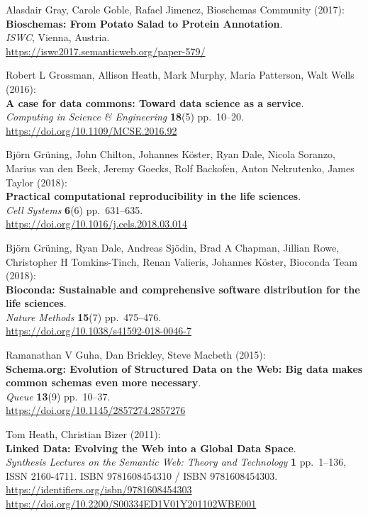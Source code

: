 \begin{thebibliography}{9}
Alasdair Gray, Carole Goble, Rafael Jimenez, Bioschemas
Community (2017):\\
\textbf{Bioschemas: From Potato Salad to Protein Annotation}.\\
\emph{ISWC}, Vienna, Austria.\\
\url{https://iswc2017.semanticweb.org/paper-579/}

Robert L Grossman, Allison Heath, Mark Murphy, Maria Patterson,
Walt Wells (2016):\\
\textbf{A case for data commons: Toward data science as a service}.\\
\emph{Computing in Science \& Engineering} \textbf{18}(5) pp.~10--20.\\
\url{https://doi.org/10.1109/MCSE.2016.92}

Björn Grüning, John Chilton, Johannes Köster, Ryan Dale, Nicola
Soranzo, Marius van den Beek, Jeremy Goecks, Rolf Backofen, Anton
Nekrutenko, James Taylor (2018):\\
\textbf{Practical computational reproducibility in the life sciences}.\\
\emph{Cell Systems} \textbf{6}(6) pp.~631--635.\\
\url{https://doi.org/10.1016/j.cels.2018.03.014}

Björn Grüning, Ryan Dale, Andreas Sjödin, Brad A Chapman,
Jillian Rowe, Christopher H Tomkins-Tinch, Renan Valieris, Johannes
Köster, Bioconda Team (2018):\\
\textbf{Bioconda: Sustainable and comprehensive software distribution
for the life sciences}.\\
\emph{Nature Methods} \textbf{15}(7) pp.~475--476.\\
\url{https://doi.org/10.1038/s41592-018-0046-7}

Ramanathan V Guha, Dan Brickley, Steve Macbeth (2015):\\
\textbf{Schema.org: Evolution of Structured Data on the Web: Big data
makes common schemas even more necessary}.\\
\emph{Queue} \textbf{13}(9) pp.~10--37.\\
\url{https://doi.org/10.1145/2857274.2857276}

Tom Heath, Christian Bizer (2011):\\
\textbf{Linked Data: Evolving the Web into a Global Data Space}.\\
\emph{Synthesis Lectures on the Semantic Web: Theory and Technology}
\textbf{1} pp.~1--136, ISSN 2160-4711. ISBN 9781608454310 / ISBN
9781608454303. \url{https://identifiers.org/isbn/9781608454303}\\
\url{https://doi.org/10.2200/S00334ED1V01Y201102WBE001}


\end{thebibliography}
